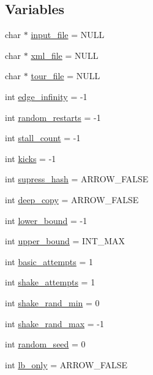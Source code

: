 \subsection*{Variables}
\begin{CompactItemize}
\item 
char $\ast$ \hyperlink{bin_2baltsp-ib_8c_a4f3a15de34c409bdec6ceacf93078ed}{input\_\-file} = NULL
\item 
char $\ast$ \hyperlink{bin_2baltsp-ib_8c_bf4e392494984c6ef8259268eb1fe421}{xml\_\-file} = NULL
\item 
char $\ast$ \hyperlink{bin_2baltsp-ib_8c_b818a82f867be75d7c4d92d792b0943e}{tour\_\-file} = NULL
\item 
int \hyperlink{bin_2baltsp-ib_8c_61a12d5995172f376610cce2f19e5855}{edge\_\-infinity} = -1
\item 
int \hyperlink{bin_2baltsp-ib_8c_e6a9db0fe5c8a0407d62dec2f7a14959}{random\_\-restarts} = -1
\item 
int \hyperlink{bin_2baltsp-ib_8c_a1641a28cf3ea572a56763e84518c17b}{stall\_\-count} = -1
\item 
int \hyperlink{bin_2baltsp-ib_8c_b8f057ba1ad6b7f0c46f8140b25b3467}{kicks} = -1
\item 
int \hyperlink{bin_2baltsp-ib_8c_c022145e682345ed4064bad274e5a4f1}{supress\_\-hash} = ARROW\_\-FALSE
\item 
int \hyperlink{bin_2baltsp-ib_8c_7298da576a5b127d04b4c46b3bc78821}{deep\_\-copy} = ARROW\_\-FALSE
\item 
int \hyperlink{bin_2baltsp-ib_8c_ed7394fd8e0c2796b26b9654fd10fd9d}{lower\_\-bound} = -1
\item 
int \hyperlink{bin_2baltsp-ib_8c_f5a34eb1d01ffd792adcadc9627ffcb8}{upper\_\-bound} = INT\_\-MAX
\item 
int \hyperlink{bin_2baltsp-ib_8c_227b7ec968925f365b96a92ace419c56}{basic\_\-attempts} = 1
\item 
int \hyperlink{bin_2baltsp-ib_8c_a4451667ac0b07bcf8396ecdb8c90f6e}{shake\_\-attempts} = 1
\item 
int \hyperlink{bin_2baltsp-ib_8c_b7fc57ece1162e77f74b4803961b72cb}{shake\_\-rand\_\-min} = 0
\item 
int \hyperlink{bin_2baltsp-ib_8c_bcacd5fab89a9f3eaab5401c5001b4c5}{shake\_\-rand\_\-max} = -1
\item 
int \hyperlink{bin_2baltsp-ib_8c_d9059bc845096b2f05414a66c836b4ee}{random\_\-seed} = 0
\item 
int \hyperlink{bin_2baltsp-ib_8c_f328dea7847a1b1888dc14a570d0ec45}{lb\_\-only} = ARROW\_\-FALSE

\end{CompactItemize}
